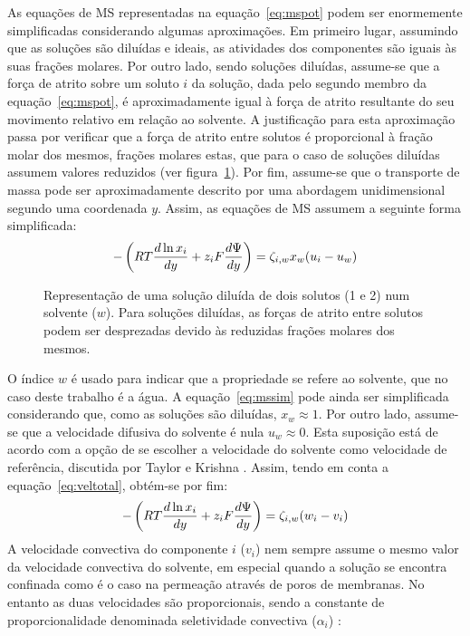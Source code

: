 As equações de MS representadas na equação~\ref{eq:mspot} podem ser enormemente simplificadas considerando algumas aproximações. Em primeiro lugar, assumindo que as soluções são diluídas e ideais, as atividades dos componentes são iguais às suas frações molares. 
Por outro lado, sendo soluções diluídas, assume-se que a força de atrito sobre um soluto $i$ da solução, dada pelo segundo membro da equação~\ref{eq:mspot}, é aproximadamente igual à força de atrito resultante do seu movimento relativo em relação ao solvente. A justificação para esta aproximação passa por verificar que a força de atrito entre solutos é proporcional à fração molar dos mesmos, frações molares estas, que para o caso de soluções diluídas assumem valores reduzidos (ver figura~\ref{fig:soldil}). Por fim, assume-se que o transporte de massa pode ser aproximadamente descrito por uma abordagem unidimensional segundo uma coordenada $y$. Assim, as equações de MS assumem a seguinte forma simplificada:
\begin{equation}
  	\label{eq:mssim}
  	-\left(R T\frac{d\ln x_{i}}{dy}+z_{i}F\frac{d\Psi}{dy}\right)=\zeta_{i,w}x_{w}(u_{i}-u_{w})
\end{equation}
\begin{figure}[t]
\centering

\caption[Representação de uma solução diluída de dois solutos]{Representação de uma solução diluída de dois solutos (1 e 2) num solvente ($w$). Para soluções diluídas, as forças de atrito entre solutos podem ser desprezadas devido às reduzidas frações molares dos mesmos.}
\label{fig:soldil}
\end{figure}%
O índice $w$ é usado para indicar que a propriedade se refere ao solvente, que no caso deste trabalho é a água. A equação~\ref{eq:mssim} pode ainda ser simplificada considerando que, como as soluções são diluídas, $x_{w}\approx 1$. Por outro lado, assume-se que a velocidade difusiva do solvente é nula $u_w\approx 0$. Esta suposição está de acordo com a opção de se escolher a velocidade do solvente como velocidade de referência, discutida por Taylor e Krishna \cite{taylor}. Assim, tendo em conta a equação~\ref{eq:veltotal}, obtém-se por fim:
\begin{equation}
	\label{eq:mssimples}
	-\left(R T\frac{d\ln x_{i}}{dy}+z_{i}F\frac{d\Psi}{dy}\right)=\zeta_{i,w}(w_{i}-v_{i})
\end{equation}
A velocidade convectiva do componente $i$ ($v_{i}$) nem sempre assume o mesmo valor da velocidade convectiva do solvente, em especial quando a solução se encontra confinada como é o caso na permeação através de poros de membranas. No entanto as duas velocidades são proporcionais, sendo a constante de proporcionalidade denominada seletividade convectiva ($\alpha_i$) \cite{noordman}:
